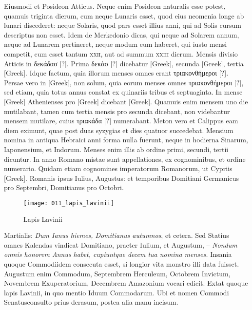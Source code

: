 Eiusmodi et Posideon Atticus.
Neque enim Posideon
naturalis esse potest, quamuis triginta dierum, cum neque Lunaris
esset, quod eius neomenia longe ab lunari discederet: neque Solaris,
quod pars esset illius anni, qui ad Solis cursum descriptus non esset.
Idem de Merkedonio dicas, qui neque ad Solarem annum, neque ad
Lunarem pertineret, neque modum eum haberet, qui iusto mensi
competit, cum esset tantum \textsc{xxii}, aut ad summum \textsc{xxiii} dierum.
Mensis divisio Atticis in \textgreek{δεκάδασ [?]}.
Prima \textgreek{δεκὰσ [?]} dicebatur \textgreek{[Greek]},
secunda \textgreek{[Greek]}, tertia \textgreek{[Greek]}.
Idque factum, quia
illorum menses omnes erant \textgreek{τριακονθήμεροι [?]}.
Persae vero in \textgreek{[Greek]},
non solum, quia eorum menses omnes \textgreek{τριακονθήμεροι [?]},
 sed etiam, quia
totus annus constat ex quinariis tribus et septuaginta.
In mense \textgreek{[Greek]}
Athenienses pro \textgreek{[Greek]} dicebant \textgreek{[Greek]}.
Quamuis
enim mensem uno die mutilabant, tamen cum tertia mensis
pro secunda dicebant, non videbantur mensem mutilare, cuius
\textgreek{τριακάδα [?]} numerabant.
Meton vero et Calippus eam diem eximunt,
quae post duas syzygias et dies quatuor succedebat.
Mensium nomina
in antiqua Hebraici anni forma nulla fuerunt, neque in hodierna
Sinarum, Iaponensium, et Indorum.
Menses enim illis ab ordine
primi, secundi, tertii dicuntur.
In anno Romano mistae sunt appellationes,
ex cognominibus, et ordine numerario.
Quidam etiam cognomines
imperatorum Romanorum, ut Cypriis \textgreek{[Greek]}.
Romanis ipsus Iulius, Augustus: et temporibus Domitiani
Germanicus pro Septembri, Domitianus pro Octobri.
\begin{figure}[t]
  \centering
  \texttt{[image: 011\_lapis\_lavinii]}
  \caption{Lapis Lavinii}
  \label{fig:lapis_lavinii}
\end{figure}
Martialis:
 \textit{Dum Ianus hiemes, Domitianus
autumnos}, et cetera.
Sed Statius omnes
Kalendas vindicat Domitiano,
praeter Iulium, et Augustum,
– \textit{Nondum omnis honorem
Annus habet, cupiuntque decem tua
nomina menses.}
Insania quoque
Commodiidem consecuta esset, si
longior vita monstro illi data fuisset.
Augustum enim Commodum,
Septembrem Herculeum, Octobrem
Invictum, Novembrem
Exuperatorium, Decembrem
Amazonium vocari edicit.
Extat
quoque lapis Lavinii, in quo mentio
Iduum Commodarum.
Ubi et
nomen Commodi Senatusconsulto prius derasum, postea alia manu
incisum.

